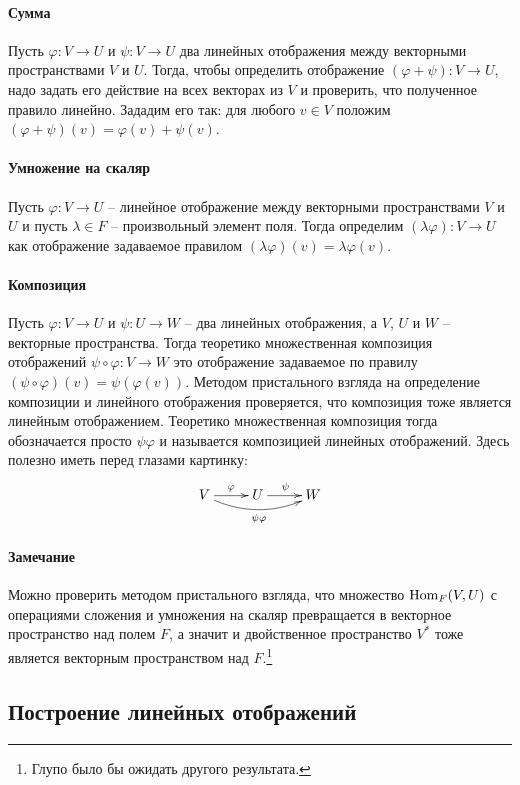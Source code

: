\paragraph{Сумма} Пусть $\varphi\colon V\to U$ и $\psi \colon V\to U$ два линейных отображения между векторными пространствами $V$ и $U$. Тогда, чтобы определить отображение $(\varphi+\psi)\colon V\to U$, надо задать его действие на всех векторах из $V$ и проверить, что полученное правило линейно. Зададим его так: для любого $v\in V$ положим $(\varphi + \psi)(v) = \varphi(v) + \psi(v)$.

\paragraph{Умножение на скаляр} Пусть $\varphi\colon V\to U$ -- линейное отображение между векторными пространствами $V$ и $U$ и пусть $\lambda \in F$ -- произвольный элемент поля. Тогда определим $(\lambda \varphi)\colon V\to U$ как отображение задаваемое правилом $(\lambda\varphi)(v) = \lambda \varphi(v)$.

\paragraph{Композиция} Пусть $\varphi\colon V\to U$ и $\psi \colon U \to W$ -- два линейных отображения, а $V$, $U$ и $W$ -- векторные пространства. Тогда теоретико множественная композиция отображений $\psi\circ \varphi\colon V\to W$ это отображение задаваемое по правилу $(\psi\circ \varphi)(v) = \psi(\varphi(v))$. Методом пристального взгляда на определение композиции и линейного отображения проверяется, что композиция тоже является линейным отображением. Теоретико множественная композиция тогда обозначается просто $\psi\varphi$ и называется композицией линейных отображений. Здесь полезно иметь перед глазами картинку:
\[
\xymatrix{
  {V}\ar[r]^{\varphi}\ar@/_10pt/[rr]_{\psi\varphi}&{U}\ar[r]^{\psi}&{W}
}
\]

\paragraph{Замечание} Можно проверить методом пристального взгляда, что множество $\operatorname{Hom}_F(V,U)$ с операциями сложения и умножения на скаляр превращается в векторное пространство над полем $F$, а значит и двойственное пространство $V^*$ тоже является векторным пространством над $F$.\footnote{Глупо было бы ожидать другого результата.}

\subsection{Построение линейных отображений}


